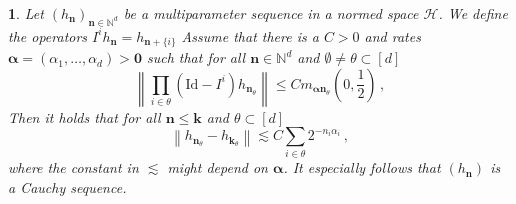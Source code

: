 \documentclass[11pt,oneside,english,reqno]{amsart}
\numberwithin{equation}{section}
\numberwithin{figure}{section}
\theoremstyle{plain}
\theoremstyle{definition}
\theoremstyle{remark}
\theoremstyle{plain}
\newtheorem{lem}[thm]{\protect\lemmaname}
\theoremstyle{plain}
\theoremstyle{plain}
\theoremstyle{plain}
\theoremstyle{plain}
\providecommand{\lemmaname}{Lemma}
\newcommand{\cH}{\mathcal{H}}
\newcommand{\NN}{\mathbb{N}}
\newcommand{\bk}{\mathbf{k}}
\newcommand{\bn}{\mathbf{n}}
\newcommand{\boo}{\mathbf{0}}
\newcommand{\balpha}{{\boldsymbol\alpha}}
\newcommand{\Id}{\mathrm{Id}}
\newcommand{\norm}[1]{\left\lVert #1\right\rVert}
\begin{document}
\begin{lem}\label{lem:technical2}
Let $(h_\bn)_{\bn\in\NN^{d}}$ be a multiparameter sequence in a normed space $\cH$. We define the operators $I^ih_\bn = h_{\bn+\{i\}}$ Assume that there is a $C>0$ and rates $\balpha = (\alpha_1,\dots,\alpha_d)>\boo$ such that for all $\bn\in\NN^d$ and $\emptyset\neq\theta\subset[d]$
%
\begin{equation}\label{ineq:Assumptionh}
    \norm{\prod_{i\in\theta} (\Id- I^i)h_{\bn_\theta}} \le Cm_{\balpha\bn_\theta}\left(0,\frac 12\right)\,,
\end{equation}
%
Then it holds that for all $\bn\le\bk$ and $\theta\subset[d]$
%
\begin{equation*}
    \norm{h_{\bn_\theta}-h_{\bk_\theta}}\lesssim C\sum_{i\in\theta}2^{-n_i\alpha_i}\,,
\end{equation*}
%
where the constant in $\lesssim$ might depend on $\balpha$. It especially follows that $(h_{\bn})$ is a Cauchy sequence.
\end{lem}
\end{document}
